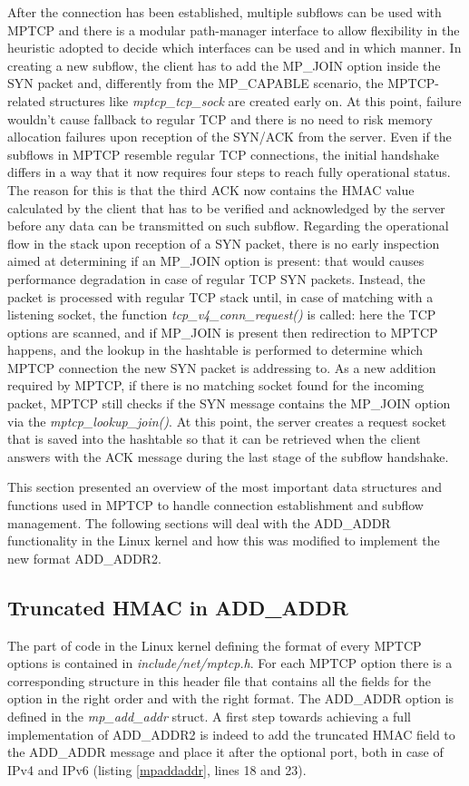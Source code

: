 After the connection has been established, multiple subflows can be used with MPTCP and there is a modular path-manager interface to allow flexibility in the heuristic adopted to decide which interfaces can be used and in which manner. In creating a new subflow, the client has to add the MP\_JOIN option inside the SYN packet and, differently from the MP\_CAPABLE scenario, the MPTCP-related structures like \textit{mptcp\_tcp\_sock} are created early on. At this point, failure wouldn't cause fallback to regular TCP and there is no need to risk memory allocation failures upon reception of the SYN/ACK from the server. Even if the subflows in MPTCP resemble regular TCP connections, the initial handshake differs in a way that it now requires four steps to reach fully operational status. The reason for this is that the third ACK now contains the HMAC value calculated by the client that has to be verified and acknowledged by the server before any data can be transmitted on such subflow. 
Regarding the operational flow in the stack upon reception of a SYN packet, there is no early inspection aimed at determining if an MP\_JOIN option is present: that would causes performance degradation in case of regular TCP SYN packets. Instead, the packet is processed with regular TCP stack until, in case of matching with a listening socket, the function \textit{tcp\_v4\_conn\_request()} is called: here the TCP options are scanned, and if MP\_JOIN is present then redirection to MPTCP happens, and the lookup in the hashtable is performed to determine which MPTCP connection the new SYN packet is addressing to. As a new addition required by MPTCP, if there is no matching socket found for the incoming packet, MPTCP still checks if the SYN message contains the MP\_JOIN option via the \textit{mptcp\_lookup\_join()}. At this point, the server creates a request socket that is saved into the hashtable so that it can be retrieved when the client answers with the ACK message during the last stage of the subflow handshake.

This section presented an overview of the most important data structures and functions used in MPTCP to handle connection establishment and subflow management. The following sections will deal with the ADD\_ADDR functionality in the Linux kernel and how this was modified to implement the new format ADD\_ADDR2.

\subsection{Truncated HMAC in ADD\_ADDR}
\label{hmacinaddaddr}
The part of code in the Linux kernel defining the format of every MPTCP options is contained in \textit{include/net/mptcp.h}. For each MPTCP option there is a corresponding structure in this header file that contains all the fields for the option in the right order and with the right format. The ADD\_ADDR option is defined in the \textit{mp\_add\_addr} struct. A first step towards achieving a full implementation of ADD\_ADDR2 is indeed to add the truncated HMAC field to the ADD\_ADDR message and place it after the optional port, both in case of IPv4 and IPv6 (listing \ref{mpaddaddr}, lines 18 and 23).

